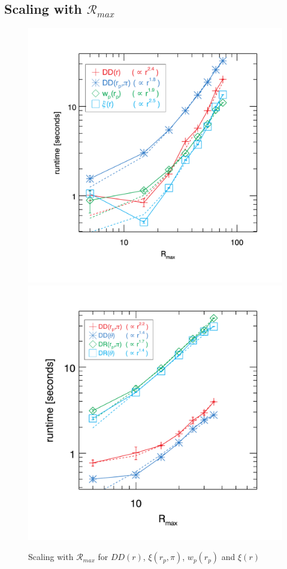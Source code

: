 \documentclass[preprint, 12pt, authoryear]{elsarticle}
\newcommand{\rmax}{\ensuremath{{{\mathcal{R}}_{max}}}\xspace}
\newcommand{\xir}{\ensuremath{{DD(r)}}\xspace}
\newcommand{\xiofr}{\ensuremath{{\xi(r)}}\xspace}
\newcommand{\wprp}{\ensuremath{{w_p(r_p)}}\xspace}
\newcommand{\xirppi}{\ensuremath{{\xi(r_p,\pi)}}\xspace}
\begin{document}
\subsection{Scaling with \rmax}
\begin{figure}[htbp]
\includegraphics[clip=true,width=0.5\linewidth]{timings_Mr19_rmax}%
\includegraphics[clip=true,width=0.5\linewidth]{timings_Mr19_mocks_rmax}
\caption{Scaling with \rmax for \xir, \xirppi, \wprp and \xiofr}
\label{fig:scaling_rmax}
\end{figure}
\end{document}
